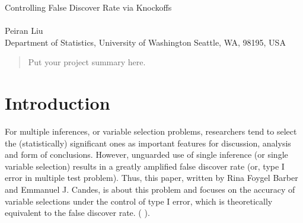\documentclass{uwstat572}
\newcommand{\vmcomment}[1]{({\color{blue}{VM's comment:}} \textbf{\color{blue}{#1}})}
\begin{document}

\begin{center}
  {\LARGE Controlling False Discover Rate via Knockoffs}\\\ \\
  {Peiran Liu \\ 
    Department of Statistics, University of Washington Seattle, WA, 98195, USA
  }
\end{center}



\begin{abstract}
  Put your project summary here.
\end{abstract}

\section{Introduction}
For multiple inferences, or variable selection problems, researchers tend to select the (statistically) significant ones as important features for discussion, analysis and form of conclusions. 
However, unguarded use of single inference (or single variable selection) results in a greatly amplified false discover rate (or, type I error in multiple test problem). Thus, this paper, written by Rina Foygel Barber and Emmanuel J. Candes, is about this problem and focuses on the accuracy of variable selections under the control of type I error, which is theoretically equivalent to the false discover rate.
\vmcomment{The above paragraph has lots of undefined terms. Start from the very beginning and explain what you mean by multiple inferences; define variable selection. Keep in mind that introduction should use as few formulae as possible}.
\end{document}
